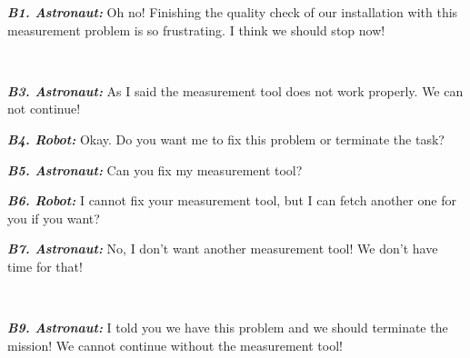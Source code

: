 \begin{description}
  \item \textit{\textbf{B1. Astronaut:}} Oh no! Finishing the quality check of
  our installation with this measurement problem is so frustrating. I think we
  should stop now!\\

  \item {}\\
  
  \item \textit{\textbf{B3. Astronaut:}} As I said the measurement tool does not
  work properly. We can not continue!\\

  \item \textit{\textbf{B4. Robot:}} Okay. Do you want me to fix this problem
  or terminate the task?\\

  \item \textit{\textbf{B5. Astronaut:}} Can you fix my measurement tool?\\
  
  \item \textit{\textbf{B6. Robot:}} I cannot fix your measurement tool, but I
  can fetch another one for you if you want?\\
  
  \item \textit{\textbf{B7. Astronaut:}} No, I don't want another measurement tool!
  We don't have time for that!\\
  
  \item {}\\
  
  \item \textit{\textbf{B9. Astronaut:}} I told you we have this problem and we
  should terminate the mission! We cannot continue without the measurement
  tool!
\end{description}

